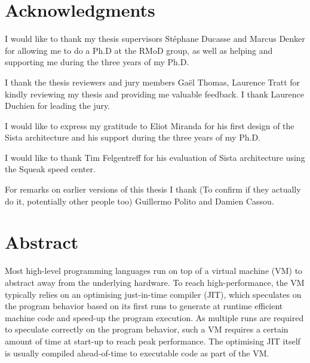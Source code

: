 \documentclass[a4paper,12pt,twoside]{includes/ThesisStyle}
\begin{document}

\dominitoc


\cleardoublepage

\section*{Acknowledgments}

I would like to thank my thesis supervisors St\'ephane Ducasse and Marcus Denker for allowing me to do a Ph.D at the RMoD group, as well as helping and supporting me during the three years of my Ph.D.

I thank the thesis reviewers and jury members Ga\"el Thomas, Laurence Tratt for kindly reviewing my thesis and providing me valuable feedback. I thank Laurence Duchien for leading the jury.

I would like to express my gratitude to Eliot Miranda for his first design of the Sista architecture and his support during the three years of my Ph.D. 

I would like to thank Tim Felgentreff for his evaluation of Sista architecture using the Squeak speed center.

For remarks on earlier versions of this thesis I thank (To confirm if they actually do it, potentially other people too) Guillermo Polito and Damien Cassou.

\cleardoublepage

\section*{Abstract}

Most high-level programming languages run on top of a virtual machine (VM) to abstract away from the underlying hardware. To reach high-performance, the VM typically relies on an optimising just-in-time compiler (JIT), which speculates on the program behavior based on its first runs to generate at runtime efficient machine code and speed-up the program execution. As multiple runs are required to speculate correctly on the program behavior, such a VM requires a certain amount of time at start-up to reach peak performance. The optimising JIT itself is usually compiled ahead-of-time to executable code as part of the VM.
\end{document}
